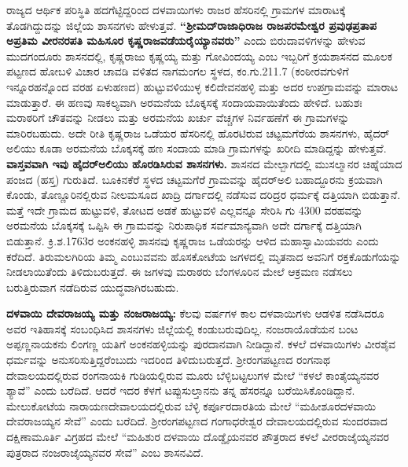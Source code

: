 ರಾಜ್ಯದ ಆರ್ಥಿಕ ಪರಿಸ್ಥಿತಿ ಹದಗೆಟ್ಟಿದ್ದರಿಂದ ದಳವಾಯಿಗಳು ರಾಜರ ಹೆಸರಿನಲ್ಲಿ ಗ್ರಾಮಗಳ ಮಾರಾಟಕ್ಕೆ ತೊಡಗಿದ್ದುದನ್ನು ಜಿಲ್ಲೆಯ ಶಾಸನಗಳು ಹೇಳುತ್ತವೆ. \textbf{“ಶ‍್ರೀಮದ್​ರಾಜಾಧಿರಾಜ ರಾಜಪರಮೇಶ್ವರ ಪ್ರವುಢಪ್ರತಾಪ ಅಪ್ರತಿಮ ವೀರನರಪತಿ ಮಹಿಸೂರ ಕೃಷ್ಣರಾಜವಡೆಯರೈಯ್ಯಾನವರು”} ಎಂದು ಬಿರುದಾವಳಿಗಳನ್ನು ಹೇಳುವ ಮುದಗಂದೂರು ಶಾಸನದಲ್ಲಿ, ಕೃಷ್ಣರಾಜು ಕೃಷ್ಣಯ್ಯ ಮತ್ತು ಗೋವಿಂದಯ್ಯ ಎಂಬ ಇಬ್ಬರಿಗೆ ಕ್ರಯಶಾಸನದ ಮೂಲಕ ಪಟ್ಟಣದ ಹೋಬಳಿ ವಿಚಾರ ಚಾವಡಿ ವಳಿತದ ನಾಗಮಂಗಲ ಸ್ಥಳದ, ಕಂ.ಗು.211.7 (ಕಂಠೀರವಗುಳಿಗೆ ಇನ್ನೂರಹನ್ನೊಂದ ವರಹ ಏಳುಹಣದ) ಹುಟ್ಟುವಳಿಯುಳ್ಳ ಕಲಿದೇವನಹಳ್ಳಿ ಮತ್ತು ಅದರ ಉಪಗ್ರಾಮವನ್ನು ಮಾರಾಟ ಮಾಡುತ್ತಾರೆ. ಈ ಹಣವು ಸಾಕಲ್ಯವಾಗಿ ಅರಮನೆಯ ಬೊಕ್ಕಸಕ್ಕೆ ಸಂದಾಯವಾಯಿತೆಂದು ಹೇಳಿದೆ. ಬಹುಶಃ ಮರಾಠರಿಗೆ ಚೌತವನ್ನು ನೀಡಲು ಮತ್ತು ಅರಮನೆಯ ಖರ್ಚು ವೆಚ್ಚಗಳ ನಿರ್ವಹಣೆಗೆ ಈ ಗ್ರಾಮಗಳನ್ನು ಮಾರಿರಬಹುದು. ಅದೇ ರೀತಿ ಕೃಷ್ಣರಾಜ ಒಡೆಯರ ಹೆಸರಿನಲ್ಲಿ ಹೊರಟಿರುವ ಚಟ್ಟಮಗೆರೆಯ ಶಾಸನಗಳು, ಹೈದರ್​ಅಲಿಯು ಕೂಡಾ ಅರಮನೆಯ ಬೊಕ್ಕಸಕ್ಕೆ ಹಣ ಸಂದಾಯ ಮಾಡಿ ಗ್ರಾಮಗಳನ್ನು ಖರೀದಿ ಮಾಡಿದ್ದನ್ನು ಹೇಳುತ್ತವೆ. \textbf{ವಾಸ್ತವವಾಗಿ ಇವು ಹೈದರ್​ಅಲಿಯು ಹೊರಡಿಸಿರುವ ಶಾಸನಗಳು.} ಶಾಸನದ ಮೇಲ್ಬಾಗದಲ್ಲಿ ಮುಸಲ್ಮಾನರ ಚಿಹ್ನೆಯಾದ ಪಂಜದ (ಹಸ್ತ) ಗುರುತಿದೆ. ಬೂಕಿನಕೆರೆ ಸ್ಥಳದ ಚಟ್ಟಮಗೆರೆ ಗ್ರಾಮವನ್ನು ಹೈದರ್​ಅಲಿ ಬಹಾದ್ದೂರನು ಕ್ರಯವಾಗಿ ಕೊಂಡು, ತೊಣ್ಣೂರಿನಲ್ಲಿರುವ ನೀಲಮಸೂದ ಖಾದ್ರಿ ದರ್ಗಾದಲ್ಲಿ ನಡೆಸುವ ದರಿದ್ರರ ಧರ್ಮಕ್ಕೆ ದತ್ತಿಯಾಗಿ ಬಿಡುತ್ತಾನೆ. ಮತ್ತೆ ಇದೇ ಗ್ರಾಮದ ಹುಟ್ಟುವಳಿ, ತೋಟದ ಅಡಕೆ ಹುಟ್ಟುವಳಿ ಎಲ್ಲವನ್ನೂ ಸೇರಿಸಿ ಗು 4300 ವರಹವನ್ನು ಅರಮನೆಯ ಬೊಕ್ಕಸಕ್ಕೆ ಒಪ್ಪಿಸಿ ಈ ಗ್ರಾಮವನ್ನು ನಿರುಪಾಧಿಕ ಸರ್ವಮಾನ್ಯವಾಗಿ ಅದೇ ದರ್ಗಾಕ್ಕೆ ದತ್ತಿಯಾಗಿ ಬಿಡುತ್ತಾನೆ. ಕ್ರಿ.ಶ.1763ರ ಅಂಕನಹಳ್ಳಿ ಶಾಸನವು ಕೃಷ್ಣರಾಜ ಒಡೆಯರನ್ನು ಆಳಿದ ಮಹಾಸ್ವಾಮಿಯವರು ಎಂದು ಕರೆದಿದೆ. ತಿರುಮಲಗಿರಿಯ ತಿಮ್ಮ ಎಂಬುವವನು ಹೊಸಕೋಟೆಯ ಜಗಳದಲ್ಲಿ ಮೃತನಾದ ಅವನಿಗೆ ರಕ್ತಕೊಡುಗೆಯನ್ನು ನೀಡಲಾಯಿತೆಂದು ತಿಳಿದುಬರುತ್ತದೆ. ಈ ಜಗಳವು ಮರಾಠರು ಬೆಂಗಳೂರಿನ ಮೇಲೆ ಆಕ್ರಮಣ ನಡೆಸಲು ಬರುತ್ತಿರುವಾಗ ನಡೆದಿರುವ ಯುದ್ಧವಾಗಿರಬಹುದು.

\textbf{ದಳವಾಯಿ ದೇವರಾಜಯ್ಯ ಮತ್ತು ನಂಜರಾಜಯ್ಯ: } ಕೆಲವು ವರ್ಷಗಳ ಕಾಲ ದಳವಾಯಿಗಳು ಆಡಳಿತ ನಡೆಸಿದರೂ ಅವರ ಇತಿಹಾಸಕ್ಕೆ ಸಂಬಂಧಿಸಿದ ಶಾಸನಗಳು ಜಿಲ್ಲೆಯಲ್ಲಿ ಕಂಡುಬರುವುದಿಲ್ಲ. ನಂಜರಾಯೊಡೆಯನ ಬಂಟ ಅಪ್ಪಣ್ಣನಾಯಕನು ಲಿಂಗಣ್ಣ ಯತಿಗೆ ಅಂಕನಹಳ್ಳಿಯನ್ನು ಪುರದಾನವಾಗಿ ನೀಡಿದ್ದಾನೆ. ಕಳಲೆ ದಳವಾಯಿಗಳು ವೀರಶೈವ ಧರ್ಮವನ್ನು ಅನುಸರಿಸುತ್ತಿದ್ದರೆಂಬುದು ಇದರಿಂದ ತಿಳಿದುಬರುತ್ತದೆ. ಶ‍್ರೀರಂಗಪಟ್ಟಣದ ರಂಗನಾಥ ದೇವಾಲಯದಲ್ಲಿರುವ ರಂಗನಾಯಕಿ ಗುಡಿಯಲ್ಲಿರುವ ಮೂರು ಬೆಳ್ಳಿಬಟ್ಟಲುಗಳ ಮೇಲೆ “ಕಳಲೆ ಕಾಂತೈಯ್ಯನವರ ಶ್ಯಾವೆ” ಎಂದು ಬರೆದಿದೆ. ಆದರೆ ಇದರ ಕೆಳಗೆ ಟಪ್ಪುಸುಲ್ತಾನನು ತನ್ನ ಹೆಸರನ್ನೂ ಬರೆಯಿಸಿಕೊಂಡಿದ್ದಾನೆ. ಮೇಲುಕೋಟೆಯ ನಾರಾಯಣದೇವಾಲಯದಲ್ಲಿರುವ ಬೆಳ್ಳಿ ಕರ್ಪೂರದಾರತಿಯ ಮೇಲೆ “ಮಹೀಶೂರದಳವಾಯಿ ದೇವರಾಜಯ್ಯನ ಸೇವೆ” ಎಂದು ಬರೆದಿದೆ. ಶ‍್ರೀರಂಗಪಟ್ಟಣದ ಗಂಗಾಧರೇಶ್ವರ ದೇವಾಲಯದಲ್ಲಿರುವ ಸುಂದರವಾದ ದಕ್ಷಿಣಾಮೂರ್ತಿ ವಿಗ್ರಹದ ಮೇಲೆ “ಮಹಿಶುರ ದಳವಾಯಿ ದೊಡ್ಡೈಯ\-ನವರ ಪೌತ್ರರಾದ ಕಳಲೆ ವೀರರಾಜೈಯ್ಯನವರ ಪುತ್ರರಾದ ನಂಜರಾಜೈಯ್ಯನವರ ಸೇವೆ” ಎಂಬ ಶಾಸನವಿದೆ.

